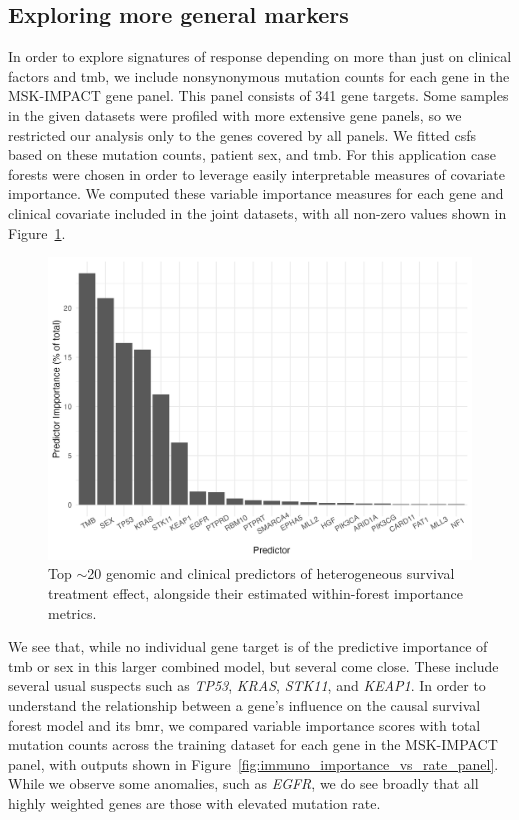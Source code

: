 \documentclass[../thesis.tex]{subfiles}
\begin{document}
\subsection{Exploring more general markers}
In order to explore signatures of response depending on more than just on clinical factors and \gls{tmb}, we include nonsynonymous mutation counts for each gene in the MSK-IMPACT gene panel. This panel consists of 341 gene targets. Some samples in the given datasets were profiled with more extensive gene panels, so we restricted our analysis only to the genes covered by all panels. We fitted \glspl{csf} based on these mutation counts, patient sex, and \gls{tmb}. For this application case forests were chosen in order to leverage easily interpretable measures of covariate importance. We computed these variable importance measures for each gene and clinical covariate included in the joint datasets, with all non-zero values shown in Figure~\ref{fig:immuno_panel_variable_importance}. 

\begin{figure}[!tpb] 
\centering
\includegraphics[width=\textwidth]{figures/chapter4/immuno_panel_variable_importance.png}
\caption{Top $\sim$20 genomic and clinical predictors of heterogeneous survival treatment effect, alongside their estimated within-forest importance metrics.  \label{fig:immuno_panel_variable_importance}}
\end{figure}

We see that, while no individual gene target is of the predictive importance of \gls{tmb} or sex in this larger combined model, but several come close. These include several usual suspects such as \emph{TP53}, \emph{KRAS}, \emph{STK11}, and \emph{KEAP1}. In order to understand the relationship between a gene's influence on the causal survival forest model and its \gls{bmr}, we compared variable importance scores with total mutation counts across the training dataset for each gene in the MSK-IMPACT panel, with outputs shown in Figure~\ref{fig:immuno_importance_vs_rate_panel}. While we observe some anomalies, such as \emph{EGFR}, we do see broadly that all highly weighted genes are those with elevated mutation rate.
\end{document}
